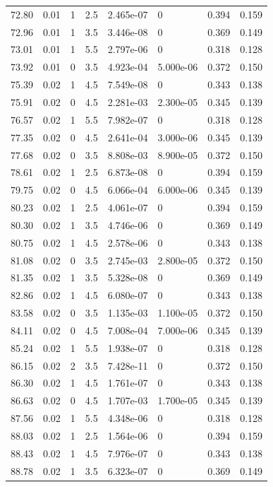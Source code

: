 \documentclass[preview]{standalone}
\begin{document}
{{{{\begin{tabular}{L{1.2cm}C{1.2cm} C{0.3cm}C{0.5cm} C{1.4cm}C{1.4cm} C{1.4cm}C{1.4cm}}
  72.80  &  0.01  & 1     & 2.5 &  2.465e-07  & 0  & 0.394 &  0.159   \\ 
  72.96  &  0.01  & 1     & 3.5 &  3.446e-08  & 0  & 0.369 &  0.149   \\ 
  73.01  &  0.01  & 1     & 5.5 &  2.797e-06  & 0  & 0.318 &  0.128   \\ 
  73.92  &  0.01  & 0     & 3.5 &  4.923e-04  & 5.000e-06  & 0.372 &  0.150   \\ 
  75.39  &  0.02  & 1     & 4.5 &  7.549e-08  & 0  & 0.343 &  0.138   \\ 
  75.91  &  0.02  & 0     & 4.5 &  2.281e-03  & 2.300e-05  & 0.345 &  0.139   \\ 
  76.57  &  0.02  & 1     & 5.5 &  7.982e-07  & 0  & 0.318 &  0.128   \\ 
  77.35  &  0.02  & 0     & 4.5 &  2.641e-04  & 3.000e-06  & 0.345 &  0.139   \\ 
  77.68  &  0.02  & 0     & 3.5 &  8.808e-03  & 8.900e-05  & 0.372 &  0.150   \\ 
  78.61  &  0.02  & 1     & 2.5 &  6.873e-08  & 0  & 0.394 &  0.159   \\ 
  79.75  &  0.02  & 0     & 4.5 &  6.066e-04  & 6.000e-06  & 0.345 &  0.139   \\ 
  80.23  &  0.02  & 1     & 2.5 &  4.061e-07  & 0  & 0.394 &  0.159   \\ 
  80.30  &  0.02  & 1     & 3.5 &  4.746e-06  & 0  & 0.369 &  0.149   \\ 
  80.75  &  0.02  & 1     & 4.5 &  2.578e-06  & 0  & 0.343 &  0.138   \\ 
  81.08  &  0.02  & 0     & 3.5 &  2.745e-03  & 2.800e-05  & 0.372 &  0.150   \\ 
  81.35  &  0.02  & 1     & 3.5 &  5.328e-08  & 0  & 0.369 &  0.149   \\ 
  82.86  &  0.02  & 1     & 4.5 &  6.080e-07  & 0  & 0.343 &  0.138   \\ 
  83.58  &  0.02  & 0     & 3.5 &  1.135e-03  & 1.100e-05  & 0.372 &  0.150   \\ 
  84.11  &  0.02  & 0     & 4.5 &  7.008e-04  & 7.000e-06  & 0.345 &  0.139   \\ 
  85.24  &  0.02  & 1     & 5.5 &  1.938e-07  & 0  & 0.318 &  0.128   \\ 
  86.15  &  0.02  & 2     & 3.5 &  7.428e-11  & 0  & 0.372 &  0.150   \\ 
  86.30  &  0.02  & 1     & 4.5 &  1.761e-07  & 0  & 0.343 &  0.138   \\ 
  86.63  &  0.02  & 0     & 4.5 &  1.707e-03  & 1.700e-05  & 0.345 &  0.139   \\ 
  87.56  &  0.02  & 1     & 5.5 &  4.348e-06  & 0  & 0.318 &  0.128   \\ 
  88.03  &  0.02  & 1     & 2.5 &  1.564e-06  & 0  & 0.394 &  0.159   \\ 
  88.43  &  0.02  & 1     & 4.5 &  7.976e-07  & 0  & 0.343 &  0.138   \\ 
  88.78  &  0.02  & 1     & 3.5 &  6.323e-07  & 0  & 0.369 &  0.149   \\ 
\hline 
\end{tabular} 

}}}}
\end{document}
